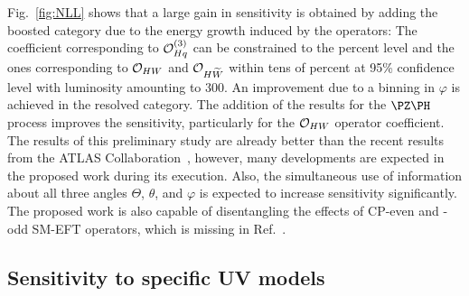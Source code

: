 \documentclass[a4paper,11pt]{article}
\begin{document}
Fig.~\ref{fig:NLL} shows that a large gain in sensitivity is obtained by adding the boosted category due to the energy growth induced by the operators:
The coefficient corresponding to ${\cal O}^{(3)}_{Hq}$ can be constrained to the percent level and the ones corresponding to ${\cal O}_{HW}$ and ${\cal O}_{H\widetilde{W}}$ within tens of percent at 95\% confidence level with luminosity amounting to 300\fbinv. 
An improvement due to a binning in $\varphi$ is achieved in the resolved category. 
The addition of the results for the $\PZ\PH$ process improves the sensitivity, particularly for the ${\cal O}_{HW}$ operator coefficient.
The results of this preliminary study are already better than the recent results from the ATLAS Collaboration~\cite{ATLAS-CONF-2021-051},
however, many developments are expected in the proposed work during its execution.
Also, the simultaneous use of information about all three angles $\Theta$, $\theta$, and $\varphi$ is expected to increase sensitivity significantly.
The proposed work is also capable of disentangling the effects of CP-even and -odd SM-EFT operators, which is missing in Ref.~\cite{ATLAS-CONF-2021-051}. 

\subsection{Sensitivity to specific UV models}
\label{sec:Zprime}
\end{document}
